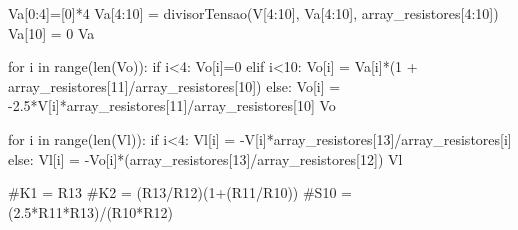 \begin{python}

    Va[0:4]=[0]*4
    Va[4:10] = divisorTensao(V[4:10], Va[4:10], array_resistores[4:10])
    Va[10] = 0
    Va

    for i in range(len(Vo)):
    if i<4:
    Vo[i]=0
    elif i<10:
    Vo[i] = Va[i]*(1 + array_resistores[11]/array_resistores[10])
    else:
    Vo[i] = -2.5*V[i]*array_resistores[11]/array_resistores[10]
    Vo

    for i in range(len(Vl)):
    if i<4:
    Vl[i] = -V[i]*array_resistores[13]/array_resistores[i]
    else:
    Vl[i] = -Vo[i]*(array_resistores[13]/array_resistores[12])
    Vl

    #K1 = R13
    #K2 = (R13/R12)(1+(R11/R10))
    #S10 = (2.5*R11*R13)/(R10*R12)

\end{python}